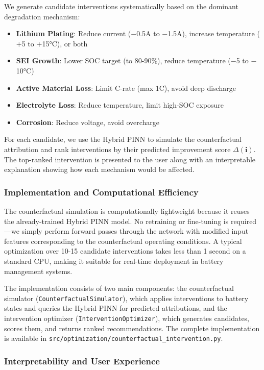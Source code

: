 \documentclass[5p,times,authoryear]{elsarticle}
\begin{document}
We generate candidate interventions systematically based on the dominant degradation mechanism:

\begin{itemize}
\item \textbf{Lithium Plating}: Reduce current ($-$0.5A to $-$1.5A), increase temperature ($+$5 to $+$15°C), or both
\item \textbf{SEI Growth}: Lower SOC target (to 80-90\%), reduce temperature ($-$5 to $-$10°C)
\item \textbf{Active Material Loss}: Limit C-rate (max 1C), avoid deep discharge
\item \textbf{Electrolyte Loss}: Reduce temperature, limit high-SOC exposure
\item \textbf{Corrosion}: Reduce voltage, avoid overcharge
\end{itemize}

For each candidate, we use the Hybrid PINN to simulate the counterfactual attribution and rank interventions by their predicted improvement score $\Delta(\mathbf{i})$. The top-ranked intervention is presented to the user along with an interpretable explanation showing how each mechanism would be affected.

\subsubsection{Implementation and Computational Efficiency}

The counterfactual simulation is computationally lightweight because it reuses the already-trained Hybrid PINN model. No retraining or fine-tuning is required---we simply perform forward passes through the network with modified input features corresponding to the counterfactual operating conditions. A typical optimization over 10-15 candidate interventions takes less than 1 second on a standard CPU, making it suitable for real-time deployment in battery management systems.

The implementation consists of two main components: the counterfactual simulator (\texttt{CounterfactualSimulator}), which applies interventions to battery states and queries the Hybrid PINN for predicted attributions, and the intervention optimizer (\texttt{InterventionOptimizer}), which generates candidates, scores them, and returns ranked recommendations. The complete implementation is available in \texttt{src/optimization/counterfactual\_intervention.py}.

\subsubsection{Interpretability and User Experience}
\end{document}
